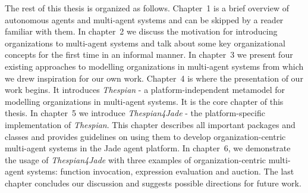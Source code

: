 The rest of this thesis is organized as follows.
Chapter~1 is a brief overview of autonomous agents and multi-agent systems and can be skipped by a reader familiar with them.
In chapter~2 we discuss the motivation for introducing organizations to multi-agent systems and talk about some key organizational concepts for the first time in an informal manner.
In chapter~3 we present four existing approaches to modelling organizations in multi-agent systems from which we drew inspiration for our own work.
Chapter~4 is where the presentation of our work begins. It introduces \textit{Thespian} - a platform-independent metamodel for modelling organizations in multi-agent systems. It is the core chapter of this thesis.
In chapter~5 we introduce \textit{Thespian4Jade} - the platform-specific implementation of \textit{Thespian}. This chapter describes all important packages and classes and provides guidelines on using them to develop organization-centric multi-agent systems in the Jade agent platform.
In chapter~6, we demonstrate the usage of \textit{Thespian4Jade} with three examples of organization-centric multi-agent systems: function invocation, expression evaluation and auction.
The last chapter concludes our discussion and suggests possible directions for future work.